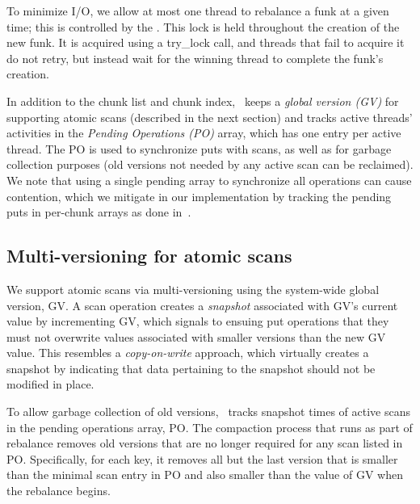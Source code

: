 To minimize I/O, we allow at most one thread to rebalance a funk at a given time; this is controlled by 
the  . 
This lock is held throughout the creation of the new funk. 
It is acquired using a try\_lock call, and threads that fail to acquire it do not retry, but instead wait for the winning thread to complete the funk's creation.

In addition to the chunk list and chunk index, \sys\ keeps a \emph{global version (GV)} for supporting atomic scans (described in the next section) and tracks active threads' activities in the 
\emph{Pending Operations (PO)} array, which has one entry per active thread. 
The PO is used to synchronize puts with scans, as well as for  garbage collection purposes (old 
versions not needed by any active scan can be reclaimed).
We note that using a single pending array to synchronize all operations can cause contention, which we
mitigate in our implementation by tracking the pending puts in per-chunk arrays as done in~\cite{kiwi}. 

\subsection{Multi-versioning for atomic scans}
\label{ssec:scans}


We support atomic scans via multi-versioning using the system-wide global version, GV. 
A scan operation creates a \emph{snapshot} associated with GV's current value by incrementing GV, 
which signals to ensuing put operations that they must not overwrite values associated with 
smaller versions than the new GV value.
This resembles a \emph{copy-on-write} approach, which virtually creates a snapshot by 
indicating that data pertaining to the snapshot should not be modified in place.  

To allow garbage collection of old versions, \sys\  tracks snapshot times of 
active scans in the pending operations array, PO.
The compaction process that runs as part of rebalance removes old versions that are no longer required for any  
scan listed in PO. Specifically, for each key, it removes all but the last version that is smaller than the minimal
scan entry in PO and also smaller than the value of GV when the rebalance begins. 

